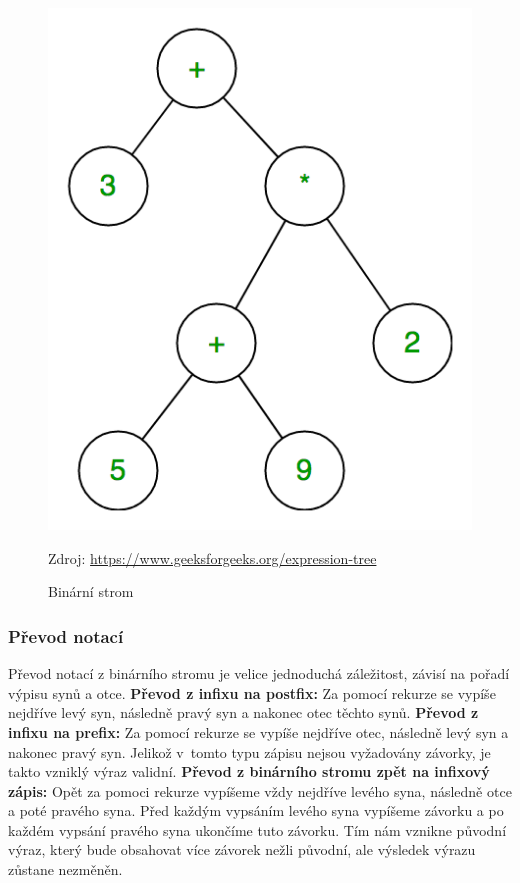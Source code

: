 \documentclass[12pt,a4paper]{report}
\newcommand{\source}[1]{\caption*{Zdroj: {#1}} }
\begin{document}
\begin{figure}[h]
    \centering
    \includegraphics[scale = 0.4]{expression-tree}
    \caption{Binární strom}
	\source{\url {https://www.geeksforgeeks.org/expression-tree}}   

\end{figure}
\newpage 
\subsubsection{Převod notací} 
Převod notací z binárního stromu je velice jednoduchá záležitost, závisí na pořadí výpisu synů a otce. \newline
\textbf{Převod z infixu na postfix:} \newline
Za pomocí rekurze se vypíše nejdříve levý syn, následně pravý syn a nakonec otec těchto synů.\newline
\textbf{Převod z infixu na prefix:} \newline
Za pomocí rekurze se vypíše nejdříve otec, následně levý syn a nakonec pravý syn. Jelikož v~tomto typu zápisu nejsou vyžadovány závorky, je takto vzniklý výraz validní.\newline
\textbf{Převod z binárního stromu zpět na infixový zápis:}\newline
Opět za pomoci rekurze vypíšeme vždy nejdříve levého syna, následně otce a poté pravého syna. Před každým vypsáním levého syna vypíšeme závorku a po každém vypsání pravého syna ukončíme tuto závorku. Tím nám vznikne původní výraz, který bude obsahovat více závorek nežli původní, ale výsledek výrazu zůstane nezměněn. 
\end{document}
